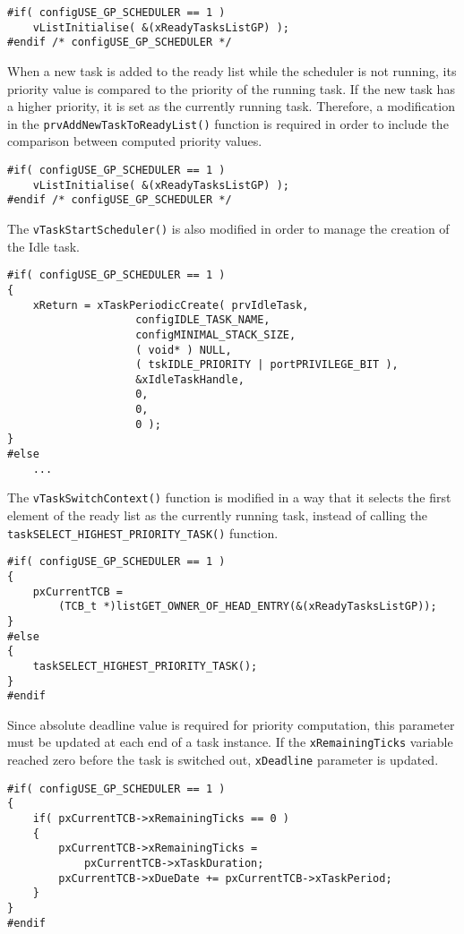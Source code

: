 \begin{lstlisting}[frame=none, label={ready_list}, caption={Declaration of the new ready tasks list.}, captionpos=b]
#if( configUSE_GP_SCHEDULER == 1 )
	vListInitialise( &(xReadyTasksListGP) );
#endif /* configUSE_GP_SCHEDULER */
\end{lstlisting}
When a new task is added to the ready list while the scheduler is not running, its priority value is compared to the priority of the running task. 
If the new task has a higher priority, it is set as the currently running task.
Therefore, a modification in the \verb$prvAddNewTaskToReadyList()$ function is required in order to include the comparison between computed priority values. 
\begin{lstlisting}[frame=none, label={newtask}, caption={Modification of the \texttt{prvAddNewTaskToReadyList()} function.}, captionpos=b]
#if( configUSE_GP_SCHEDULER == 1 )
	vListInitialise( &(xReadyTasksListGP) );
#endif /* configUSE_GP_SCHEDULER */
\end{lstlisting}
The \verb$vTaskStartScheduler()$ is also modified in order to manage the creation of the Idle task.
\begin{lstlisting}[frame=none, label={idle}, caption={Creation of the Idle task.}, captionpos=b]
#if( configUSE_GP_SCHEDULER == 1 )
{
	xReturn = xTaskPeriodicCreate( prvIdleTask,
					configIDLE_TASK_NAME,
					configMINIMAL_STACK_SIZE,
					( void* ) NULL,
					( tskIDLE_PRIORITY | portPRIVILEGE_BIT ),
					&xIdleTaskHandle,
					0,
					0,
					0 );
}
#else 
	...
\end{lstlisting}
The \verb$vTaskSwitchContext()$ function is modified in a way that it selects the first element of the ready list as the currently running task, instead of calling the \\\verb$taskSELECT_HIGHEST_PRIORITY_TASK()$ function.
\begin{lstlisting}[frame=none, label={switchcontext}, caption={\texttt{vTaskSwitchContext()} modification.}, captionpos=b]
#if( configUSE_GP_SCHEDULER == 1 )
{
	pxCurrentTCB =
		(TCB_t *)listGET_OWNER_OF_HEAD_ENTRY(&(xReadyTasksListGP));
}
#else 
{
	taskSELECT_HIGHEST_PRIORITY_TASK();
}
#endif
\end{lstlisting} 
Since absolute deadline value is required for priority computation, this parameter must be updated at each end of a task instance.
If the \verb$xRemainingTicks$ variable reached zero before the task is switched out, \verb$xDeadline$ parameter is updated.
\begin{lstlisting}[frame=none, label={taskfinish}, caption={\texttt{Updating the \texttt{xDeadline} parameter at the end of task instance}.}, captionpos=b]
#if( configUSE_GP_SCHEDULER == 1 )
{
	if( pxCurrentTCB->xRemainingTicks == 0 ) 
	{
		pxCurrentTCB->xRemainingTicks = 
			pxCurrentTCB->xTaskDuration;
		pxCurrentTCB->xDueDate += pxCurrentTCB->xTaskPeriod;
	}
}
#endif
\end{lstlisting}
